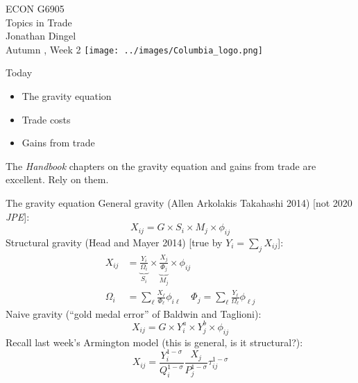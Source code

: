 \documentclass[10pt,notes=hide,aspectratio=169]{beamer}
\begin{document}
\begin{frame}[plain]
\begin{center}
\large
\textcolor{columbiadarkblue}{ECON G6905\\
Topics in Trade\\ 
Jonathan Dingel\\
Autumn \the\year, Week 2}
\vfill 
\texttt{[image: ../images/Columbia\_logo.png]}
\end{center}
\end{frame}
\begin{frame}{Today}
\begin{itemize}
	\item The gravity equation
	\item Trade costs
	\item Gains from trade
\end{itemize}
The \textit{Handbook} chapters on the gravity equation and gains from trade are excellent.
Rely on them.
\end{frame}
\begin{frame}{The gravity equation}
General gravity (Allen Arkolakis Takahashi 2014) [not 2020 \textit{JPE}]:
\begin{equation*}
X_{ij} = G \times S_i \times M_j \times \phi_{ij}
\end{equation*}
Structural gravity (Head and Mayer 2014) [true by $Y_i = \sum_j X_{ij}$]:
\begin{align*}
X_{ij} &= \underbrace{\frac{Y_i}{\Omega_i}}_{S_i} \times \underbrace{\frac{X_j}{\Phi_j}}_{M_j} \times \phi_{ij}\\
\Omega_i &= \sum_{\ell} \frac{X_{\ell}}{\Phi_{\ell}} \phi_{i \ell}
\quad 
\Phi_j  = \sum_{\ell} \frac{Y_{\ell}}{\Omega_{\ell}} \phi_{\ell j}
\end{align*}
Naive gravity (``gold medal error'' of Baldwin and Taglioni):
\begin{equation*}
X_{ij} = G \times Y_i^a \times Y_j^b \times \phi_{ij}
\end{equation*}
Recall last week's Armington model (this is general, is it structural?):
\begin{equation*}
X_{ij}	= \frac{Y_i^{1-\sigma}}{Q_i^{1-\sigma}} \frac{X_j}{P_j^{1-\sigma}}\tau_{ij}^{1-\sigma}
\end{equation*}
\end{frame}
\end{document}
